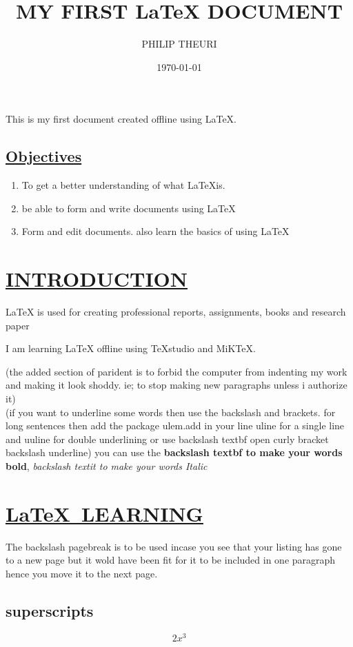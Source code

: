 \documentclass[a4paper,12pt]{article}
\title{MY FIRST \LaTeX{} DOCUMENT}
\author{PHILIP THEURI}
\date{\today}
\begin{document}
	\tableofcontents
		\maketitle
	
	This is my first document created offline using \LaTeX{}.
	
	\subsection{\underline{Objectives}}
	\begin{enumerate}
	 \item To get a better understanding of what \LaTeX is.
	\item be able to form and write documents using \LaTeX
	\item Form and edit documents. also learn the basics of using \LaTeX
	\end{enumerate}
	\section{\underline{INTRODUCTION}}
	
	\LaTeX{} is used for creating professional reports, assignments, books and research paper
	
	I am learning \LaTeX{} offline using TeXstudio and MiKTeX.
	
	
	(the added section of parident is to forbid the computer from indenting my work and making it look shoddy. ie; to stop making new paragraphs unless i authorize it)\\
	(if you want to underline some words then use the backslash and brackets. for long sentences then add the package ulem.add in your line uline for a single line and uuline for double underlining or use backslash textbf open curly bracket backslash underline)
	you can use the \textbf{backslash textbf to make your words bold}, \textit{backslash textit to make your words Italic}
	\section{\underline{\LaTeX\ LEARNING}}
	
	The backslash pagebreak is to be used incase you see that your listing has gone to a new page but it wold have been fit for it to be included in one paragraph hence you move it to the next page.
	\subsection{superscripts}
	$$2x^3$$
	
\end{document}
